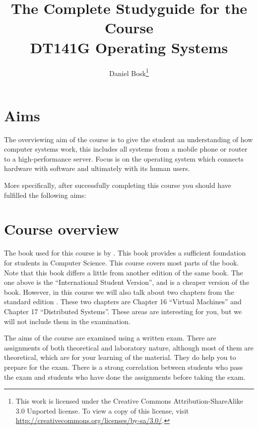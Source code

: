 \documentclass[a4paper,logo]{miunart}
\title{The Complete Studyguide for the Course\\
  DT141G Operating Systems}
\author{Daniel Bosk\footnote{%
  This work is licensed under the Creative Commons Attribution-ShareAlike 3.0 
  Unported license.
  To view a copy of this license, visit 
  \url{http://creativecommons.org/licenses/by-sa/3.0/}.
}}
\date{\svnId}
\begin{document}
\maketitle


\section{Aims}

The overviewing aim of the course is to give the student an understanding of 
how computer systems work, this includes all systems from a mobile phone or 
router to a high-performance server.
Focus is on the operating system which connects hardware with software and 
ultimately with its human users.

More specifically, after successfully completing this course you should have 
fulfilled the following aims:
\begin{itemize}
%  
%  
%  
%  
%  
%  
  
\end{itemize}


\section{Course overview}

The book used for this course is  by 
\citet{Silberschatz2013intl}.
This book provides a sufficient foundation for students in Computer Science.
This course covers most parts of the book.
Note that this book differs a little from another edition of the same book.
The one above is the ``International Student Version'', and is a cheaper 
version of the book.
However, in this course we will also talk about two chapters from the standard 
edition \cite{Silberschatz2013osc}.
These two chapters are Chapter 16 ``Virtual Machines'' and Chapter 17 
``Distributed Systems''.
These areas are interesting for you, but we will not include them in the 
examination.

The aims of the course are examined using a written exam.
There are assignments of both theoretical and laboratory nature, although most 
of them are theoretical, which are for your learning of the material.
They do help you to prepare for the exam.
There is a strong correlation between students who pass the exam and students 
who have done the assignments before taking the exam.
\end{document}
